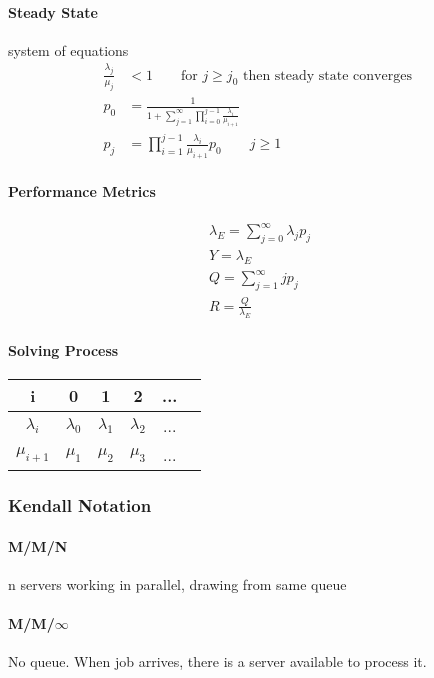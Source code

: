 \paragraph{Steady State} system of equations
\begin{align*}
	\frac{\lambda_j}{\mu_j} &< 1 \qquad \mbox{for } j \ge j_0  \mbox{ then steady state converges }\\
	p_0 &= \frac{1}{1 + \sum_{j=1}^\infty \prod_{i=0}^{j-1} \frac{\lambda_i}{\mu_{i+1}}} \\
	p_j &= \prod_{i=1}^{j-1} \frac{\lambda_{i}}{\mu_{i+1}} p_0 \qquad j \ge 1
\end{align*}

\paragraph{Performance Metrics}
\begin{align*}
	\lambda_E = \sum_{j=0}^\infty \lambda_j p_j \\
	Y = \lambda_E \\
	Q = \sum_{j=1}^\infty j p_j \\
	R = \frac{Q}{\lambda_E}
\end{align*}

\paragraph{Solving Process}
\begin{tabular}{ c | c c c c c}
	i           & 0           & 1           & 2           & ...\\
	\hline
	$\lambda_i$ & $\lambda_0$ & $\lambda_1$ & $\lambda_2$ & ... \\
	$\mu_{i+1}$ & $\mu_1$     & $\mu_2$     &  $\mu_3$    & ... \\
\end{tabular}

\subsubsection{Kendall Notation}
\paragraph{M/M/N} n servers working in parallel, drawing from same queue
\paragraph{M/M/$\infty$} No queue. When job arrives, there is a server available
to process it.
